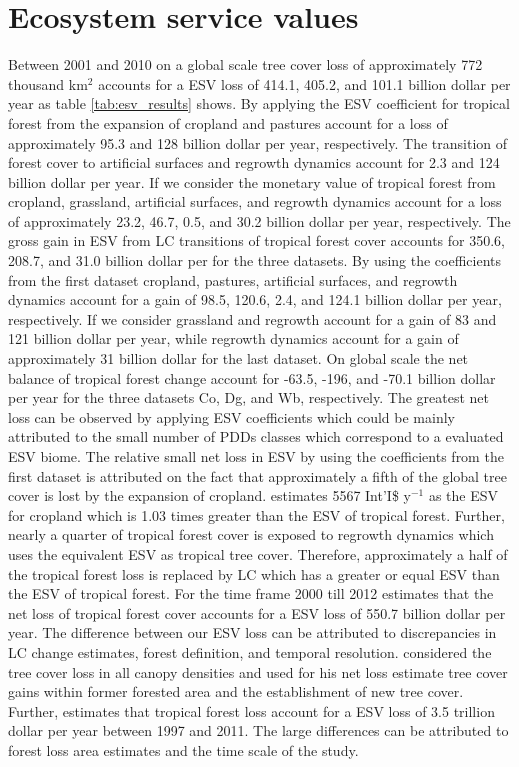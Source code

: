 	\section{Ecosystem service values}
		Between 2001 and 2010 on a global scale tree cover loss of approximately 772 thousand km$^2$ accounts for a \ac{ESV} loss of 414.1, 405.2, and 101.1 billion dollar per year as table \ref{tab:esv_results} shows. By applying the \ac{ESV} coefficient for tropical forest from \citet{Costanza2014} the expansion of cropland and pastures account for a loss of approximately 95.3 and 128 billion dollar per year, respectively. The transition of forest cover to artificial surfaces and regrowth dynamics account for 2.3 and 124 billion dollar per year. If we consider the monetary value of tropical forest from \citet{Siikamaki2015} cropland, grassland, artificial surfaces, and regrowth dynamics account for a loss of approximately 23.2, 46.7, 0.5, and 30.2 billion dollar per year, respectively. The gross gain in \ac{ESV} from \ac{LC} transitions of tropical forest cover accounts for 350.6, 208.7, and 31.0 billion dollar per for the three datasets. By using the coefficients from the first dataset cropland, pastures, artificial surfaces, and regrowth dynamics account for a gain of 98.5, 120.6, 2.4, and 124.1 billion dollar per year, respectively. If we consider \citet{Groot2012} grassland and regrowth account for a gain of 83 and 121 billion dollar per year, while regrowth dynamics account for a gain of approximately 31 billion dollar for the last dataset. On global scale the net balance of tropical forest change account for -63.5, -196, and -70.1 billion dollar per year for the three datasets Co, Dg, and Wb, respectively. The greatest net loss can be observed by applying \citeauthor{Groot2012} \ac{ESV} coefficients which could be mainly attributed to the small number of \acp{PDD} classes which correspond to a evaluated \ac{ESV} biome. The relative small net loss in \ac{ESV} by using the coefficients from the first dataset is attributed on the fact that approximately a fifth of the global tree cover is lost by the expansion of cropland. \citeauthor{Costanza2014} estimates 5567 Int'I\$ y$^{-1}$ as the \ac{ESV} for cropland which is 1.03 times greater than the \ac{ESV} of tropical forest. Further, nearly a quarter of tropical forest cover is exposed to regrowth dynamics which uses the equivalent \ac{ESV} as tropical tree cover. Therefore, approximately a half of the tropical forest loss is replaced by \ac{LC} which has a greater or equal \ac{ESV} than the \ac{ESV} of tropical forest. For the time frame 2000 till 2012 \citet{Song2018} estimates that the net loss of tropical forest cover accounts for a \ac{ESV} loss of 550.7 billion dollar per year. The difference between our \ac{ESV} loss can be attributed to discrepancies in \ac{LC} change estimates, forest definition, and temporal resolution. \citeauthor{Song2018} considered the tree cover loss in all canopy densities and used for his net loss estimate tree cover gains within former forested area and the establishment of new tree cover. Further, \citet{Costanza2014} estimates that tropical forest loss account for a \ac{ESV} loss of 3.5 trillion dollar per year between 1997 and 2011. The large differences can be attributed to forest loss area estimates and the time scale of the study.
